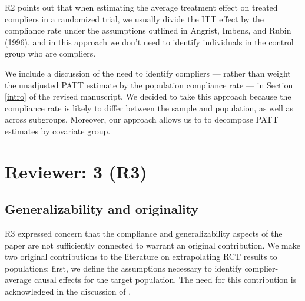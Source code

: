 \documentclass[hidelinks,12pt,letterpaper]{article}
\begin{document}
R2 points out that when estimating the average treatment effect on treated compliers in a randomized trial, we usually divide the ITT effect by the compliance rate under the assumptions outlined in Angrist, Imbens, and Rubin (1996), and in this approach we don't need to identify individuals in the control group who are compliers.

We include a discussion of the need to identify compliers --- rather than weight the unadjusted PATT estimate by the population compliance rate --- in Section \ref{intro} of the revised manuscript. We decided to take this approach because the compliance rate is likely to differ between the sample and population, as well as across subgroups. Moreover, our approach allows us to to decompose PATT estimates by covariate group. 

\section{Reviewer: 3 (R3)}

\subsection{Generalizability and originality}


R3 expressed concern that the compliance and generalizability aspects of the paper are not sufficiently connected to warrant an original contribution. We make two original contributions to the literature on extrapolating RCT results to populations: first, we define the assumptions necessary to identify complier-average causal effects for the target population. The need for this contribution is acknowledged in the discussion of \citet{Hartman}. 
\end{document}
